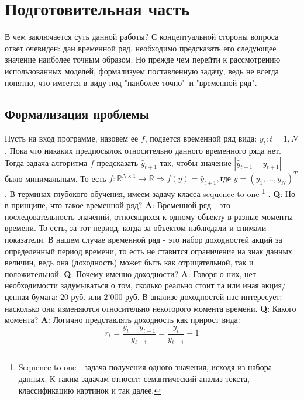 \section{Подготовительная часть}
	В чем заключается суть данной работы? С концептуальной стороны вопроса ответ очевиден: дан временной ряд, необходимо предсказать его следующее значение наиболее точным образом. Но прежде чем перейти к рассмотрению использованных моделей,  формализуем поставленную задачу, ведь не всегда понятно, что имеется в виду под "наиболее точно"\ и "временной ряд".
	\subsection{Формализация проблемы}
		Пусть на вход программе, назовем ее $f$, подается временной ряд вида: $y_t: t = \overline{1,N}$. Пока что никаких предпосылок относительно данного временного ряда нет. Тогда задача алгоритма $f$ предсказать $\hat{y}_{t + 1}$ так, чтобы значение $|\hat{y}_{t + 1} - y_{t + 1}|$ было минимальным. То есть $f: \mathbb{R}^{N \times 1} \to \mathbb{R} \Rightarrow f(y) = \hat{y}_{t + 1}, \text{где } y = \left(y_1,\ldots,y_N\right)^T$. В терминах глубокого обучения, имеем задачу класса sequence to one \footnote{Sequence to one - задача получения одного значения, исходя из набора данных. К таким задачам относят: семантический анализ текста, классификацию картинок и так далее.} . \textbf{Q}: Но в принципе, что такое временной ряд? \textbf{A}: Временной ряд - это последовательность значений, относящихся к одному объекту в разные моменты времени. То есть, за тот период, когда за объектом наблюдали и снимали показатели. В нашем случае временной ряд - это набор доходностей акций за определенный период времени, то есть не ставится ограничение на знак данных величин, ведь она (доходность) может быть как отрицательной, так и положительной. \textbf{Q}: Почему именно доходности? \textbf{A}: Говоря о них, нет необходимости задумываться о том, сколько реально стоит та или иная акция/ценная бумага: $20$ руб. или $2\text{'}000$ руб. В анализе доходностей нас интересует: насколько они изменяются относительно некоторого момента времени. \textbf{Q}: Какого момента? \textbf{A}: Логично представлять доходность как прирост вида:
		\begin{equation}
			r_{t} = \frac{y_{t} - y_{t - 1}}{y_{t - 1}} = \frac{y_{t}}{y_{t - 1}} - 1
		\end{equation}
